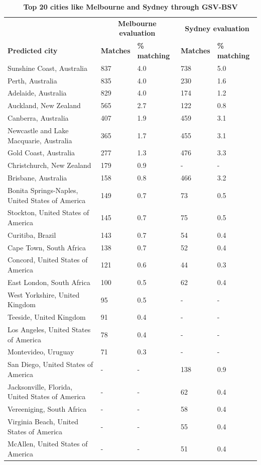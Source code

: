 \documentclass[Crown,sageh,times]{sagej}
\begin{document}
\begin{table}[!htbp]
\caption{\bf Top 20 cities like Melbourne and Sydney through GSV-BSV \label{tab:melbournesydneyGSV}}     
\begin{tabular}{ l  l l l  l}
 \hline    &  \multicolumn{2}{c}{\textbf{Melbourne evaluation}} & \multicolumn{2}{c}{\textbf{Sydney evaluation}}  \\  
\textbf{Predicted city} & \textbf{Matches} & \textbf{\% matching}  & \textbf{Matches} & \textbf{\% matching}\\ \hline
Sunshine Coast, Australia&	837&	4.0&	738&	5.0\\
Perth, Australia&	835&	4.0&	230	&1.6\\
Adelaide, Australia&	829&	4.0&	174&	1.2\\
Auckland, New Zealand&	565&	2.7	&122	&0.8\\
Canberra, Australia&	407&	1.9&	459&	3.1\\
Newcastle and Lake Macquarie, Australia	&365&	1.7&	455&	3.1\\
Gold Coast, Australia&	277&	1.3&	476	&3.3\\
Christchurch, New Zealand&	179&	0.9&	-&	-\\
Brisbane, Australia&	158&	0.8&	466	&3.2\\
Bonita Springs-Naples, United States of America&	149&	0.7&	73&	0.5\\
Stockton, United States of America&	145&	0.7&	75&	0.5\\
Curitiba, Brazil&	143&	0.7&	54&	0.4\\
Cape Town, South Africa&	138&	0.7&	52&	0.4\\
Concord, United States of America&	121&	0.6&	44&	0.3\\
East London, South Africa&	100&	0.5&	62&	0.4\\
West Yorkshire, United Kingdom&	95&	0.5&	-&	-\\
Teeside, United Kingdom&	91&	0.4&	-&	-\\
Los Angeles, United States of America&	78&	0.4&	-&	-\\
Montevideo, Uruguay&	71&	0.3&	-&	-\\
San Diego, United States of America&	-&	-&	138&	0.9\\
Jacksonville, Florida, United States of America&	-&	-&	62&	0.4\\
Vereeniging, South Africa&	-	&-&	58	&0.4\\
Virginia Beach, United States of America&	-&	-	&55&	0.4\\
McAllen, United States of America&	-	&-	&51&	0.4\\
\hline
\end{tabular}
\end{table}
\end{document}
